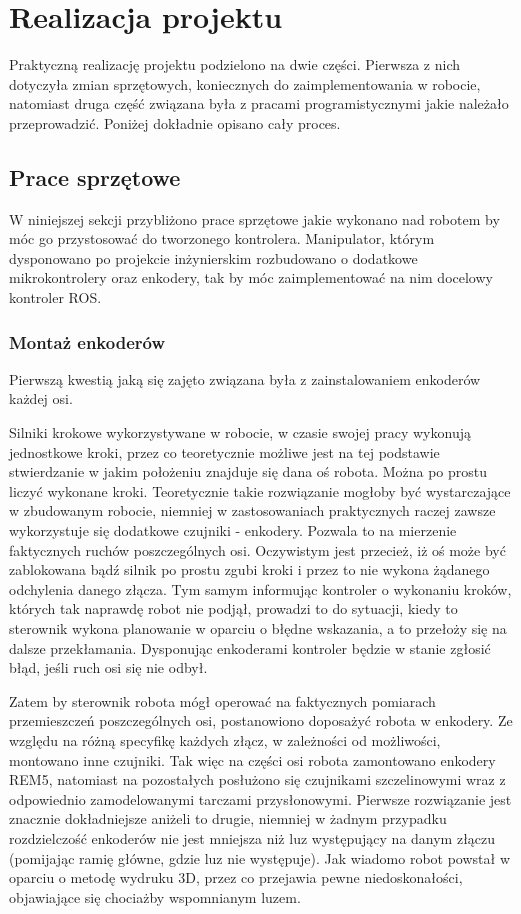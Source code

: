 \chapter{Realizacja projektu}

Praktyczną realizację projektu podzielono na dwie części. Pierwsza z nich dotyczyła zmian sprzętowych, koniecznych do zaimplementowania w robocie, natomiast druga część związana była z pracami programistycznymi jakie należało przeprowadzić. Poniżej dokładnie opisano cały proces.

\section{Prace sprzętowe}

W niniejszej sekcji przybliżono prace sprzętowe jakie wykonano nad robotem by móc go przystosować do tworzonego kontrolera. Manipulator, którym dysponowano po projekcie inżynierskim rozbudowano o dodatkowe mikrokontrolery oraz enkodery, tak by móc zaimplementować na nim docelowy kontroler ROS. 

\subsection{Montaż enkoderów}
Pierwszą kwestią jaką się zajęto związana była z zainstalowaniem enkoderów każdej osi.

Silniki krokowe wykorzystywane w robocie, w czasie swojej pracy wykonują jednostkowe kroki, przez co teoretycznie możliwe jest na tej podstawie stwierdzanie w jakim położeniu znajduje się dana oś robota. Można po prostu liczyć wykonane kroki. Teoretycznie takie rozwiązanie mogłoby być wystarczające w zbudowanym robocie, niemniej w zastosowaniach praktycznych raczej zawsze wykorzystuje się dodatkowe czujniki - enkodery. Pozwala to na mierzenie faktycznych ruchów poszczególnych osi. Oczywistym jest przecież, iż oś może być zablokowana bądź silnik po prostu zgubi kroki i przez to nie wykona żądanego odchylenia danego złącza. Tym samym informując kontroler o wykonaniu kroków, których tak naprawdę robot nie podjął, prowadzi to do sytuacji, kiedy to sterownik wykona planowanie w oparciu o błędne wskazania, a to przełoży się na dalsze przekłamania. Dysponując enkoderami kontroler będzie w stanie zgłosić błąd, jeśli ruch osi się nie odbył.


Zatem by sterownik robota mógł operować na faktycznych pomiarach przemieszczeń poszczególnych osi, postanowiono doposażyć robota w enkodery. Ze względu na różną specyfikę każdych złącz, w zależności od możliwości, montowano inne czujniki. Tak więc na części osi robota zamontowano enkodery REM5, natomiast na pozostałych posłużono się czujnikami szczelinowymi wraz z odpowiednio zamodelowanymi tarczami przysłonowymi. Pierwsze rozwiązanie jest znacznie dokładniejsze aniżeli to drugie, niemniej w żadnym przypadku rozdzielczość enkoderów nie jest mniejsza niż luz występujący na danym złączu (pomijając ramię główne, gdzie luz nie występuje). Jak wiadomo robot powstał w oparciu o metodę wydruku 3D, przez co przejawia pewne niedoskonałości, objawiające się chociażby wspomnianym luzem. 

